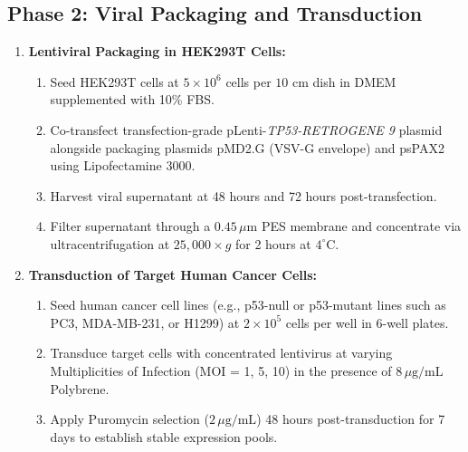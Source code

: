 \documentclass[12pt]{article}
\begin{document}
\subsection{Phase 2: Viral Packaging and Transduction}
\begin{enumerate}
    \item \textbf{Lentiviral Packaging in HEK293T Cells:}
        \begin{enumerate}
            \item Seed HEK293T cells at $5 \times 10^6$ cells per $10\text{ cm}$ dish in DMEM supplemented with 10\% FBS.
            \item Co-transfect transfection-grade pLenti-\textit{TP53-RETROGENE 9} plasmid alongside packaging plasmids pMD2.G (VSV-G envelope) and psPAX2 using Lipofectamine 3000.
            \item Harvest viral supernatant at 48 hours and 72 hours post-transfection.
            \item Filter supernatant through a $0.45\,\mu\text{m}$ PES membrane and concentrate via ultracentrifugation at $25,000 \times g$ for 2 hours at $4^\circ\text{C}$.
        \end{enumerate}
    \item \textbf{Transduction of Target Human Cancer Cells:}
        \begin{enumerate}
            \item Seed human cancer cell lines (e.g., p53-null or p53-mutant lines such as PC3, MDA-MB-231, or H1299) at $2 \times 10^5$ cells per well in 6-well plates.
            \item Transduce target cells with concentrated lentivirus at varying Multiplicities of Infection (MOI = 1, 5, 10) in the presence of $8\,\mu\text{g/mL}$ Polybrene.
            \item Apply Puromycin selection ($2\,\mu\text{g/mL}$) 48 hours post-transduction for 7 days to establish stable expression pools.
        \end{enumerate}
\end{enumerate}
\end{document}
